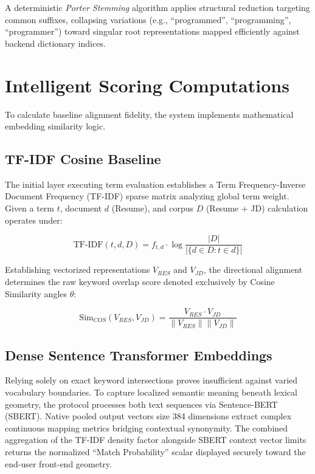 \documentclass[12pt,a4paper]{report}
\begin{document}
A deterministic \textit{Porter Stemming} algorithm applies structural reduction targeting common suffixes, collapsing variations (e.g., ``programmed'', ``programming'', ``programmer'') toward singular root representations mapped efficiently against backend dictionary indices.

\section{Intelligent Scoring Computations}
To calculate baseline alignment fidelity, the system implements mathematical embedding similarity logic. 

\subsection{TF-IDF Cosine Baseline}
The initial layer executing term evaluation establishes a Term Frequency-Inverse Document Frequency (TF-IDF) sparse matrix analyzing global term weight. Given a term $t$, document $d$ (Resume), and corpus $D$ (Resume + JD) calculation operates under:

\begin{equation}
\text{TF-IDF}(t, d, D) = f_{t,d} \cdot \log{\frac{|D|}{|\{d \in D : t \in d\}|}}
\end{equation}

Establishing vectorized representations $V_{RES}$ and $V_{JD}$, the directional alignment determines the raw keyword overlap score denoted exclusively by Cosine Similarity angles $\theta$:

\begin{equation}
\text{Sim}_{COS}(V_{RES}, V_{JD}) = \frac{V_{RES} \cdot V_{JD}}{\|V_{RES}\| \|V_{JD}\|} 
\end{equation}

\subsection{Dense Sentence Transformer Embeddings}
Relying solely on exact keyword intersections proves insufficient against varied vocabulary boundaries. To capture localized semantic meaning beneath lexical geometry, the protocol processes both text sequences via Sentence-BERT (SBERT). Native pooled output vectors size 384 dimensions extract complex continuous mapping metrics bridging contextual synonymity. The combined aggregation of the TF-IDF density factor alongside SBERT context vector limits returns the normalized ``Match Probability'' scalar displayed securely toward the end-user front-end geometry.
\end{document}
